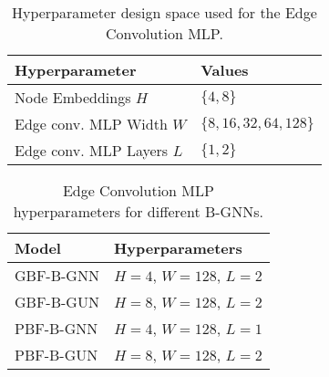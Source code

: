 \documentclass{marine_2025_paper_template}
\begin{document}
\noindent
\begin{minipage}{0.52\textwidth}
\centering

    \begin{table}[H]
    \centering
    \caption{Hyperparameter design space used for the Edge Convolution MLP.}
    \label{tab:optimal_hyperparamters}
    \begin{tabular}{|>{\raggedright\arraybackslash}p{4.6cm}|>{\raggedright\arraybackslash}p{3.0cm}|}
    \hline
    
    \textbf{Hyperparameter} & \textbf{Values} \\
    \hline
    
    Node Embeddings $H$ & ${\{ 4, 8 \}}$ \\ \hline
    Edge conv. MLP Width $W$ & ${\{8, 16, 32, 64, 128 \}}$ \\ \hline
    Edge conv. MLP Layers $L$ & ${\{1, 2 \}}$ \\ \hline
    
    \hline
    \end{tabular}
    \end{table}

\end{minipage}
\hfill
\begin{minipage}{0.42\textwidth}
    
    \begin{table}[H]
    \centering
    \caption{Edge Convolution MLP hyperparameters for different B-GNNs.}
    \label{tab:four_bgnns}
    \begin{tabular}{|>{\raggedright\arraybackslash}p{2.3cm}|>{\raggedright\arraybackslash}p{3.5cm}|}
    \hline
    
    \textbf{Model} & \textbf{Hyperparameters} \\
    \hline
    
    GBF-B-GNN & $H=4$, $W=128$, $L=2$\\ \hline
    GBF-B-GUN & $H=8$, $W=128$, $L=2$\\ \hline
    PBF-B-GNN & $H=4$, $W=128$, $L=1$\\ \hline
    PBF-B-GUN & $H=8$, $W=128$, $L=2$\\ \hline
    
    \hline
    \end{tabular}
    \end{table}
\end{minipage}

\renewcommand{\bibname}{References}
\setlength\bibhang{0pt} %


\end{document}
